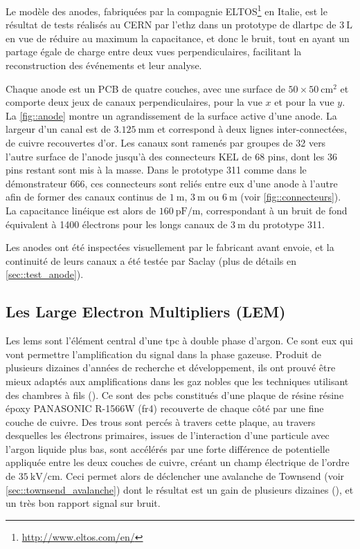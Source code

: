             Le modèle des anodes, fabriquées par la compagnie ELTOS\footnote{\url{http://www.eltos.com/en/}} en Italie, est le résultat de tests réalisés au CERN par l'\gls{ethz} dans un prototype de \gls{dlartpc} de $\SI{3}{\liter}$ \cite{cantini_anode} en vue de réduire au maximum la capacitance, et donc le bruit, tout en ayant un partage égale de charge entre deux vues perpendiculaires, facilitant la reconstruction des événements et leur analyse.
            
            Chaque anode est un PCB de quatre couches, avec une surface de  $50\times\SI{50}{\centi\meter\squared}$ et comporte deux jeux de canaux perpendiculaires,  pour la vue $x$ et  pour la vue $y$. La \autoref{fig::anode} montre un agrandissement de la surface active d'une anode. La largeur d'un canal est de $\SI{3.125}{\milli\meter}$ et correspond à deux lignes inter-connectées, de cuivre recouvertes d'or. Les canaux sont ramenés par groupes de 32 vers l'autre surface de l'anode jusqu'à des connecteurs KEL de 68 pins, dont les 36 pins restant sont mis à la masse. Dans le prototype 311 comme dans le démonstrateur 666, ces connecteurs sont reliés entre eux d'une anode à l'autre afin de former des canaux continus de $\SI{1}{\meter}$, $\SI{3}{\meter}$ ou $\SI{6}{\meter}$ (voir  \autoref{fig::connecteurs}). La capacitance linéique est alors de $\SI{160}{\pico\farad\per\meter}$, correspondant à un bruit de fond équivalent à 1400 électrons \cite{311paper2018} pour les longs canaux de $\SI{3}{\meter}$ du prototype 311.
            
            Les anodes ont été inspectées visuellement par le fabricant avant envoie, et la continuité de leurs canaux a été testée par Saclay (plus de détails en \autoref{sec::test_anode}).
        
        \subsection{Les Large Electron Multipliers (LEM)}\label{sec::LEM}
        
            Les \glspl{lem} sont l'élément central d'une \gls{tpc} à double phase d'argon. Ce sont eux qui vont permettre l'amplification du signal dans la phase gazeuse. Produit de plusieurs dizaines d'années de recherche et développement, ils ont prouvé être mieux adaptés aux amplifications dans les gaz nobles que les techniques utilisant des chambres à fils (\cite{GEM,THGEM}). Ce sont des \glspl{pcb} constitués d'une plaque de résine résine époxy PANASONIC R-1566W (\gls{fr4}) recouverte de chaque côté par une fine couche de cuivre. Des trous sont percés à travers cette plaque, au travers desquelles les électrons primaires, issues de l'interaction d'une particule avec l'argon liquide plus bas, sont accélérés par une forte différence de potentielle appliquée entre les deux couches de cuivre, créant un champ électrique de l'ordre de $\SI{35}{\kilo\volt\per\centi\meter}$. Ceci permet alors de déclencher une avalanche de Townsend (voir \autoref{sec::townsend_avalanche}) dont le résultat est un gain de plusieurs dizaines (\cite{3L}), et un très bon rapport signal sur bruit.
            
